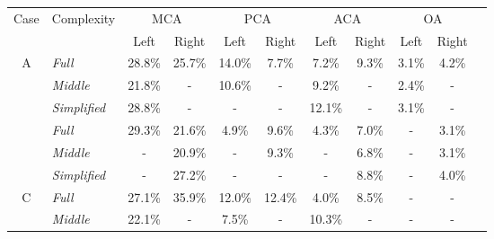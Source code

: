 \begin{table}[!htb]
	\centering
	\small
	\begin{tabular}{clccccccccc}
		\cmidrule(lr){1-10}
		Case               & Complexity          & \multicolumn{2}{c}{MCA} & \multicolumn{2}{c}{PCA} & \multicolumn{2}{c}{ACA} & \multicolumn{2}{c}{OA}                                  \\
		                   &                     & Left                    & Right                   & Left                    & Right                  & Left   & Right & Left  & Right \\
		\cmidrule(lr){1-10}
		\multirow{3}{*}{A} & \textit{Full}       & 28.8\%                  & 25.7\%                  & 14.0\%                  & 7.7\%                  & 7.2\%  & 9.3\% & 3.1\% & 4.2\% \\
		                   & \textit{Middle}     & 21.8\%                  & -                       & 10.6\%                  & -                      & 9.2\%  & -     & 2.4\% & -     \\
		                   & \textit{Simplified} & 28.8\%                  & -                       & -                       & -                      & 12.1\% & -     & 3.1\% & -     \\
		\arrayrulecolor{black!30}\cmidrule(lr){2-10}
		\multirow{3}{*}{B} & \textit{Full}       & 29.3\%                  & 21.6\%                  & 4.9\%                   & 9.6\%                  & 4.3\%  & 7.0\% & -     & 3.1\% \\
		                   & \textit{Middle}     & -                       & 20.9\%                  & -                       & 9.3\%                  & -      & 6.8\% & -     & 3.1\% \\
		                   & \textit{Simplified} & -                       & 27.2\%                  & -                       & -                      & -      & 8.8\% & -     & 4.0\% \\
		\cmidrule(lr){2-10}
		\multirow{3}{*}{C} & \textit{Full}       & 27.1\%                  & 35.9\%                  & 12.0\%                  & 12.4\%                 & 4.0\%  &
		8.5\%              & -                   & -                                                                                                                                     \\
		                   & \textit{Middle}     & 22.1\%                  & -                       & 7.5\%                   & -                      & 10.3\% & -     & -     & -     \\

\end{tabular}
\end{table}
